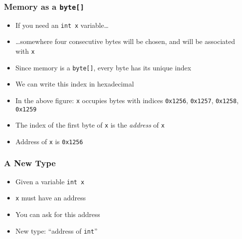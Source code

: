 \documentclass{../ucll-slides}
\begin{document}
\begin{frame}
  \frametitle{Memory as a {\tt byte[]}}
  \begin{center}
  \end{center}
  \begin{itemize}
    \item If you need an {\tt int x} variable\dots
    \item \dots somewhere four consecutive bytes will be chosen,
          and will be associated with {\tt x}
    \item<3-> Since memory is a {\tt byte[]}, every byte has its unique index
    \item<4-> We can write this index in hexadecimal
    \item<5-> In the above figure: {\tt x} occupies bytes with indices {\tt 0x1256}, {\tt 0x1257}, {\tt 0x1258}, {\tt 0x1259}
    \item<5-> The index of the first byte of {\tt x} is the \emph{address} of {\tt x}
    \item<5-> Address of {\tt x} is {\tt 0x1256}
  \end{itemize}
\end{frame}

\begin{frame}
  \frametitle{A New Type}
  \begin{itemize}
    \item Given a variable {\tt int x}
    \item {\tt x} must have an address
    \item You can ask for this address
    \item New type: ``address of {\tt int}''
  \end{itemize}
  \vskip1cm
\end{frame}
\end{document}
